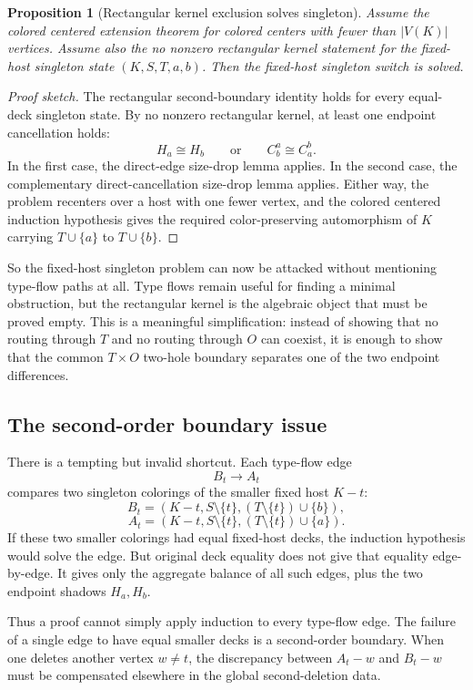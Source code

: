 \documentclass[11pt]{article}
\newtheorem{proposition}{Proposition}
\begin{document}
\begin{proposition}[Rectangular kernel exclusion solves singleton]
Assume the colored centered extension theorem for colored centers with fewer
than \(|V(K)|\) vertices.  Assume also the no nonzero rectangular kernel
statement for the fixed-host singleton state \((K,S,T,a,b)\).  Then the
fixed-host singleton switch is solved.
\end{proposition}

\begin{proof}[Proof sketch]
The rectangular second-boundary identity holds for every equal-deck
singleton state.  By no nonzero rectangular kernel, at least one endpoint
cancellation holds:
\[
  H_a\cong H_b
  \qquad\text{or}\qquad
  C_b^a\cong C_a^b.
\]
In the first case, the direct-edge size-drop lemma applies.  In the second
case, the complementary direct-cancellation size-drop lemma applies.  Either
way, the problem recenters over a host with one fewer vertex, and the colored
centered induction hypothesis gives the required color-preserving
automorphism of \(K\) carrying \(T\cup\{a\}\) to \(T\cup\{b\}\).
\end{proof}

So the fixed-host singleton problem can now be attacked without mentioning
type-flow paths at all.  Type flows remain useful for finding a minimal
obstruction, but the rectangular kernel is the algebraic object that must be
proved empty.  This is a meaningful simplification: instead of showing that
no routing through \(T\) and no routing through \(O\) can coexist, it is
enough to show that the common \(T\times O\) two-hole boundary separates one
of the two endpoint differences.

\subsection{The second-order boundary issue}

There is a tempting but invalid shortcut.  Each type-flow edge
\[
  B_t\to A_t
\]
compares two singleton colorings of the smaller fixed host \(K-t\):
\[
  B_t=(K-t,S\setminus\{t\},(T\setminus\{t\})\cup\{b\}),
\]
\[
  A_t=(K-t,S\setminus\{t\},(T\setminus\{t\})\cup\{a\}).
\]
If these two smaller colorings had equal fixed-host decks, the induction
hypothesis would solve the edge.  But original deck equality does not give
that equality edge-by-edge.  It gives only the aggregate balance of all such
edges, plus the two endpoint shadows \(H_a,H_b\).

Thus a proof cannot simply apply induction to every type-flow edge.  The
failure of a single edge to have equal smaller decks is a second-order
boundary.  When one deletes another vertex \(w\neq t\), the discrepancy
between \(A_t-w\) and \(B_t-w\) must be compensated elsewhere in the global
second-deletion data.
\end{document}
